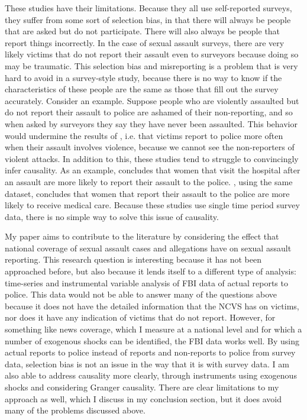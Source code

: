 \documentclass[AER,draftmode]{AEA}
\begin{document}
These studies have their limitations. Because they all use self-reported surveys, they suffer from some sort of selection bias, in that there will always be people that are asked but do not participate. There will also always be people that report things incorrectly. In the case of sexual assault surveys, there are very likely victims that do not report their assault even to surveyors because doing so may be traumatic. This selection bias and misreporting is a problem that is very hard to avoid in a survey-style study, because there is no way to know if the characteristics of these people are the same as those that fill out the survey accurately. Consider an example. Suppose people who are violently assaulted but do not report their assault to police are ashamed of their non-reporting, and so when asked by surveyors they say they have never been assaulted. This behavior would undermine the results of , i.e. that victims report to police more often when their assault involves violence, because we cannot see the non-reporters of violent attacks. In addition to this, these studies tend to struggle to convincingly infer causality. As an example,  concludes that women that visit the hospital after an assault are more likely to report their assault to the police. , using the same dataset, concludes that women that report their assault to the police are more likely to receive medical care. Because these studies use single time period survey data, there is no simple way to solve this issue of causality.

My paper aims to contribute to the literature by considering the effect that national coverage of sexual assault cases and allegations have on sexual assault reporting. This research question is interesting because it has not been approached before, but also because it lends itself to a different type of analysis: time-series and instrumental variable analysis of FBI data of actual reports to police. This data would not be able to answer many of the questions above because it does not have the detailed information that the NCVS has on victims, nor does it have any indication of victims that do not report. However, for something like news coverage, which I measure at a national level and for which a number of exogenous shocks can be identified, the FBI data works well. By using actual reports to police instead of reports and non-reports to police from survey data, selection bias is not an issue in the way that it is with survey data. I am also able to address causality more clearly, through instruments using exogenous shocks and considering Granger causality. There are clear limitations to my approach as well, which I discuss in my conclusion section, but it does avoid many of the problems discussed above.
\end{document}
